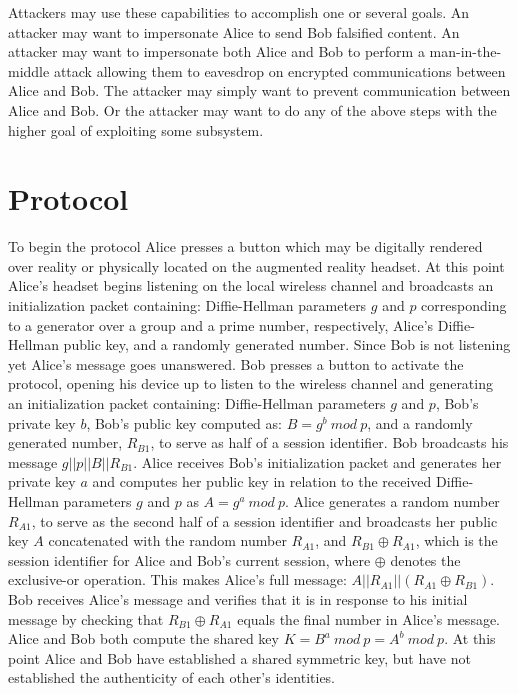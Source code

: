 \documentclass[12pt]{report}
\begin{document}
Attackers may use these capabilities to accomplish one or several goals. An attacker may want to impersonate Alice to send Bob falsified content. An attacker may want to impersonate both Alice and Bob to perform a man-in-the-middle attack allowing them to eavesdrop on encrypted communications between Alice and Bob. The attacker may simply want to prevent communication between Alice and Bob. Or the attacker may want to do any of the above steps with the higher goal of exploiting some subsystem. \par

\section{Protocol}
To begin the protocol Alice presses a button which may be digitally rendered over reality or physically located on the augmented reality headset. At this point Alice's headset begins listening on the local wireless channel and broadcasts an initialization packet containing: Diffie-Hellman parameters $g$ and $p$ corresponding to a generator over a group and a prime number, respectively, Alice's Diffie-Hellman public key, and a randomly generated number. Since Bob is not listening yet Alice's message goes unanswered. Bob presses a button to activate the protocol, opening his device up to listen to the wireless channel and generating an initialization packet containing: Diffie-Hellman parameters $g$ and $p$, Bob's private key $b$, Bob's public key computed as: $B = g^b \: mod \: p$, and a randomly generated number, $R_{B1}$, to serve as half of a session identifier. Bob broadcasts his message $g || p || B || R_{B1}$. Alice receives Bob's initialization packet and generates her private key $a$ and computes her public key in relation to the received Diffie-Hellman parameters $g$ and $p$ as $A = g^a \: mod \: p$. Alice generates a random number $R_{A1}$, to serve as the second half of a session identifier and broadcasts her public key $A$ concatenated with the random number $R_{A1}$, and $R_{B1} \oplus R_{A1}$, which is the session identifier for Alice and Bob's current session, where $\oplus$ denotes the exclusive-or operation. This makes Alice's full message: $A || R_{A1} || (R_{A1} \oplus R_{B1})$. Bob receives Alice's message and verifies that it is in response to his initial message by checking that $R_{B1} \oplus R_{A1}$ equals the final number in Alice's message. Alice and Bob both compute the shared key $K = B^a \: mod \: p = A^b \: mod \: p$. At this point Alice and Bob have established a shared symmetric key, but have not established the authenticity of each other's identities. \par
\end{document}

